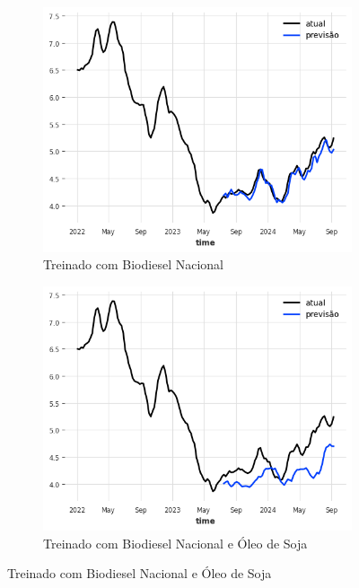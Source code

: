 \begin{figure}[htbp]
	\centering
	\begin{subfigure}[b]{0.45\textwidth}
		\centering
		\includegraphics[width=\textwidth]{figuras/nlinear_brasil_plot.png} %
		\caption{Treinado com Biodiesel Nacional \newline}
		\label{fig:nlinear_brasil_plot}
	\end{subfigure}
	\hfill
	\begin{subfigure}[b]{0.45\textwidth}
		\centering
		\includegraphics[width=\textwidth]{figuras/nlinear_brasil_oil_plot.png} %
		\caption{Treinado com Biodiesel Nacional e Óleo de Soja}
		\label{fig:nlinear_brasil_oil_plot}
	\end{subfigure}


\end{figure}
